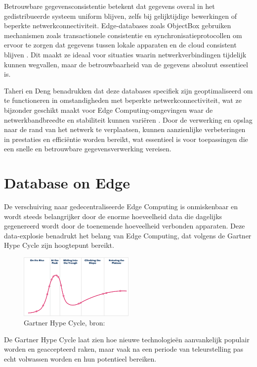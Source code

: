 Betrouwbare gegevensconsistentie betekent dat gegevens overal in het gedistribueerde systeem uniform blijven, zelfs bij gelijktijdige bewerkingen of beperkte netwerkconnectiviteit. Edge-databases zoals ObjectBox gebruiken mechanismen zoals transactionele consistentie en synchronisatieprotocollen om ervoor te zorgen dat gegevens tussen lokale apparaten en de cloud consistent blijven \autocite{Rahmani2018, Taheri2020}. Dit maakt ze ideaal voor situaties waarin netwerkverbindingen tijdelijk kunnen wegvallen, maar de betrouwbaarheid van de gegevens absoluut essentieel is.

Taheri en Deng benadrukken dat deze databases specifiek zijn geoptimaliseerd om te functioneren in omstandigheden met beperkte netwerkconnectiviteit, wat ze bijzonder geschikt maakt voor Edge Computing-omgevingen waar de netwerkbandbreedte en stabiliteit kunnen variëren \autocite{Taheri2020}.
 Door de verwerking en opslag naar de rand van het netwerk te verplaatsen, kunnen aanzienlijke verbeteringen in prestaties en efficiëntie worden bereikt, wat essentieel is voor toepassingen die een snelle en betrouwbare gegevensverwerking vereisen.

\section{Database on Edge}
De verschuiving naar gedecentraliseerde Edge Computing is onmiskenbaar en wordt steeds belangrijker door de enorme hoeveelheid data die dagelijks gegenereerd wordt door de toenemende hoeveelheid verbonden apparaten.
 Deze data-explosie benadrukt het belang van Edge Computing, dat volgens de Gartner Hype Cycle zijn hoogtepunt bereikt.

\begin{figure}[h]
    \centering
    \includegraphics[width=0.5\textwidth]{hype-cycle-illustation.png}
    \caption{Gartner Hype Cycle, bron: \autocite{Gartner2023}}
    \label{fig:hype-cycle}
\end{figure}
 
De Gartner Hype Cycle laat zien hoe nieuwe technologieën aanvankelijk populair worden en geaccepteerd raken, maar vaak na een periode van teleurstelling pas echt volwassen worden en hun potentieel bereiken.

